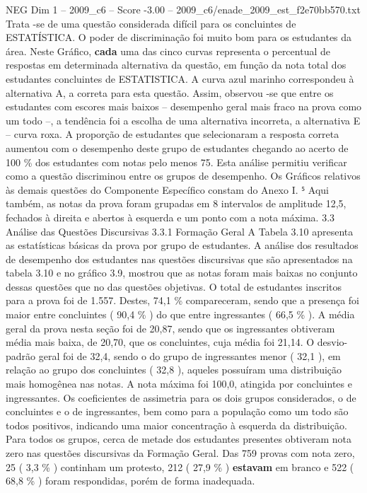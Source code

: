 \begin{textsample}{NEG Dim 1 – 2009\_c6 – Score -3.00 – 2009\_c6/enade\_2009\_est\_f2e70bb570.txt}
Trata -se de uma questão considerada difícil para os concluintes de ESTATÍSTICA.
O poder de discriminação foi muito bom para os estudantes da área.
Neste Gráfico, \textbf{cada} uma das cinco curvas representa o percentual de respostas em determinada alternativa da questão, em função da nota total dos estudantes concluintes de ESTATISTICA.
A curva azul marinho correspondeu à alternativa A, a correta para esta questão.
Assim, observou -se que entre os estudantes com escores mais baixos – desempenho geral mais fraco na prova como um todo –, a tendência foi a escolha de uma alternativa incorreta, a alternativa E – curva roxa.
A proporção de estudantes que selecionaram a resposta correta aumentou com o desempenho deste grupo de estudantes chegando ao acerto de 100 \% dos estudantes com notas pelo menos 75.
Esta análise permitiu verificar como a questão discriminou entre os grupos de desempenho.
Os Gráficos relativos às demais questões do Componente Específico constam do Anexo I. ⁵ Aqui também, as notas da prova foram grupadas em 8 intervalos de amplitude 12,5, fechados à direita e abertos à esquerda e um ponto com a nota máxima. 3.3 Análise das Questões Discursivas 3.3.1 Formação Geral A Tabela 3.10 apresenta as estatísticas básicas da prova por grupo de estudantes.
A análise dos resultados de desempenho dos estudantes nas questões discursivas que são apresentados na tabela 3.10 e no gráfico 3.9, mostrou que as notas foram mais baixas no conjunto dessas questões que no das questões objetivas.
O total de estudantes inscritos para a prova foi de 1.557.
Destes, 74,1 \% compareceram, sendo que a presença foi maior entre concluintes ( 90,4 \% ) do que entre ingressantes ( 66,5 \% ).
A média geral da prova nesta seção foi de 20,87, sendo que os ingressantes obtiveram média mais baixa, de 20,70, que os concluintes, cuja média foi 21,14.
O desvio-padrão geral foi de 32,4, sendo o do grupo de ingressantes menor ( 32,1 ), em relação ao grupo dos concluintes ( 32,8 ), aqueles possuíram uma distribuição mais homogênea nas notas.
A nota máxima foi 100,0, atingida por concluintes e ingressantes.
Os coeficientes de assimetria para os dois grupos considerados, o de concluintes e o de ingressantes, bem como para a população como um todo são todos positivos, indicando uma maior concentração à esquerda da distribuição.
Para todos os grupos, cerca de metade dos estudantes presentes obtiveram nota zero nas questões discursivas da Formação Geral.
Das 759 provas com nota zero, 25 ( 3,3 \% ) continham um protesto, 212 ( 27,9 \% ) \textbf{estavam} em branco e 522 ( 68,8 \% ) foram respondidas, porém de forma inadequada.

\end{textsample}
